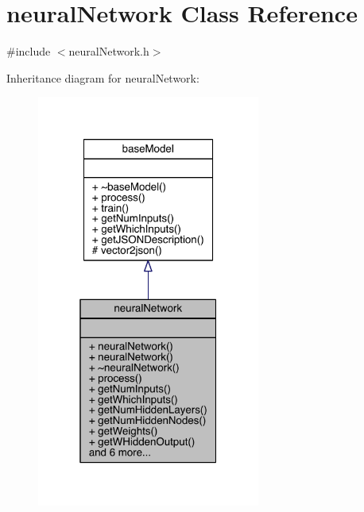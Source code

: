 \hypertarget{classneural_network}{}\section{neural\+Network Class Reference}
\label{classneural_network}


{\ttfamily \#include $<$neural\+Network.\+h$>$}



Inheritance diagram for neural\+Network\+:\nopagebreak
\begin{figure}[H]
\begin{center}
\leavevmode
\includegraphics[width=208pt]{classneural_network__inherit__graph}
\end{center}
\end{figure}


